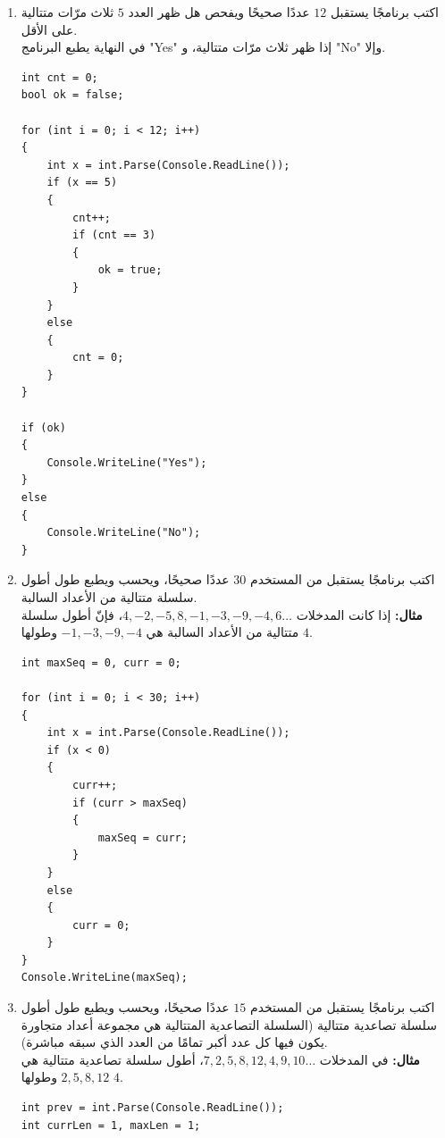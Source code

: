 \documentclass[14pt]{extarticle}
\begin{document}
\begin{enumerate}[itemsep=2em]
\begin{boxSolution}
\begin{english}
\begin{verbatim}
if (isAscending)
{
    Console.WriteLine("Ascending");
}
else
{
    Console.WriteLine("Not Ascending");
}
\end{verbatim}
\end{english}
\end{boxSolution}
\fi
\filbreak

\item اكتب برنامجًا يستقبل $12$ عددًا صحيحًا ويفحص هل ظهر العدد $5$ ثلاث مرّات متتالية على الأقل. \\
في النهاية يطبع البرنامج \textenglish{"Yes"} إذا ظهر ثلاث مرّات متتالية، و \textenglish{"No"} وإلا.
\ifwithsols
\begin{boxSolution}
\begin{english}
\begin{verbatim}
int cnt = 0;
bool ok = false;

for (int i = 0; i < 12; i++)
{
    int x = int.Parse(Console.ReadLine());
    if (x == 5)
    {
        cnt++;
        if (cnt == 3)
        {
            ok = true;
        }
    }
    else
    {
        cnt = 0;
    }
}

if (ok)
{
    Console.WriteLine("Yes");
}
else
{
    Console.WriteLine("No");
}
\end{verbatim}
\end{english}
\end{boxSolution}
\fi
\filbreak

\item اكتب برنامجًا يستقبل من المستخدم $30$ عددًا صحيحًا، ويحسب ويطبع طول أطول سلسلة متتالية من الأعداد السالبة. \\
\textbf{مثال:} إذا كانت المدخلات $4, -2, -5, 8, -1, -3, -9, -4, 6 \dots$، فإنّ أطول سلسلة متتالية من الأعداد السالبة هي $-1, -3, -9, -4$ وطولها $4$.
\ifwithsols
\begin{boxSolution}
\begin{english}
\begin{verbatim}
int maxSeq = 0, curr = 0;

for (int i = 0; i < 30; i++)
{
    int x = int.Parse(Console.ReadLine());
    if (x < 0)
    {
        curr++;
        if (curr > maxSeq)
        {
            maxSeq = curr;
        }
    }
    else
    {
        curr = 0;
    }
}
Console.WriteLine(maxSeq);
\end{verbatim}
\end{english}
\end{boxSolution}
\fi
\filbreak

\item اكتب برنامجًا يستقبل من المستخدم $15$ عددًا صحيحًا، ويحسب ويطبع طول أطول سلسلة تصاعدية متتالية (السلسلة التصاعدية المتتالية هي مجموعة أعداد متجاورة يكون فيها كل عدد أكبر تمامًا من العدد الذي سبقه مباشرة). \\
\textbf{مثال:} في المدخلات $7, 2, 5, 8, 12, 4, 9, 10 \dots$، أطول سلسلة تصاعدية متتالية هي $2, 5, 8, 12$ وطولها $4$.
\ifwithsols
\begin{boxSolution}
\begin{english}
\begin{verbatim}
int prev = int.Parse(Console.ReadLine());
int currLen = 1, maxLen = 1;


\end{verbatim}
\end{english}
\end{boxSolution}
\end{enumerate}
\end{document}
